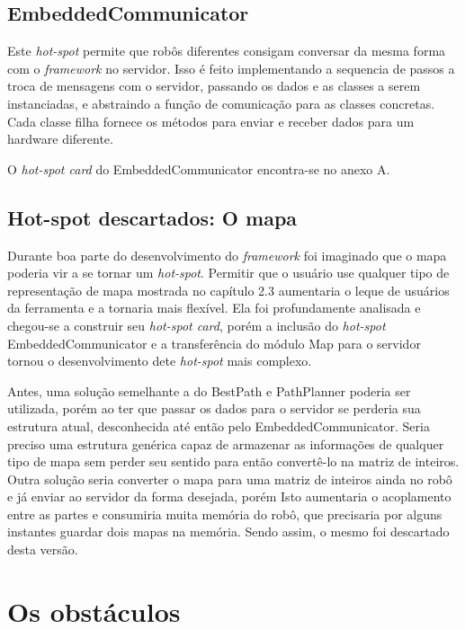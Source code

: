 \subsection{EmbeddedCommunicator}

Este \textit{hot-spot} permite que robôs diferentes consigam conversar da mesma forma com o \textit{framework} no servidor. Isso é feito implementando a sequencia de passos a troca de mensagens com o servidor, passando os dados e as classes a serem instanciadas, e abstraindo a função de comunicação para as classes concretas. Cada classe filha fornece os métodos para enviar e receber dados para um hardware diferente.

O \textit{hot-spot card} do EmbeddedCommunicator encontra-se no anexo A.

\subsection{Hot-spot descartados: O mapa}

Durante boa parte do desenvolvimento do \textit{framework} foi imaginado que o mapa poderia vir a se tornar um \textit{hot-spot}. Permitir que o usuário use qualquer tipo de representação de mapa mostrada no capítulo 2.3 aumentaria o leque de usuários da ferramenta e a tornaria mais flexível. Ela foi profundamente analisada e chegou-se a construir seu \textit{hot-spot card}, porém a inclusão do \textit{hot-spot} EmbeddedCommunicator e a transferência do módulo Map para o servidor tornou o desenvolvimento dete \textit{hot-spot} mais complexo. 

Antes, uma solução semelhante a do BestPath e PathPlanner poderia ser utilizada, porém ao ter que passar os dados para o servidor se perderia sua estrutura atual, desconhecida até então pelo EmbeddedCommunicator. Seria preciso uma estrutura genérica capaz de armazenar as informações de qualquer tipo de mapa sem perder seu sentido para então convertê-lo na matriz de inteiros. Outra solução seria converter o mapa para uma matriz de inteiros ainda no robô e já enviar ao servidor da forma desejada, porém Isto aumentaria o acoplamento entre as partes e consumiria muita memória do robô, que precisaria por alguns instantes guardar dois mapas na memória. Sendo assim, o mesmo foi descartado desta versão.

\section{Os obstáculos}


